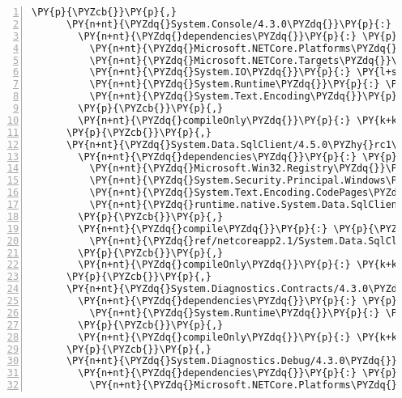 \begin{Verbatim}[commandchars=\\\{\},numbers=left,firstnumber=1,stepnumber=1,numberblanklines=0]
      \PY{p}{\PYZcb{}}\PY{p}{,}
      \PY{n+nt}{\PYZdq{}System.Console/4.3.0\PYZdq{}}\PY{p}{:} \PY{p}{\PYZob{}}
        \PY{n+nt}{\PYZdq{}dependencies\PYZdq{}}\PY{p}{:} \PY{p}{\PYZob{}}
          \PY{n+nt}{\PYZdq{}Microsoft.NETCore.Platforms\PYZdq{}}\PY{p}{:} \PY{l+s+s2}{\PYZdq{}2.1.0\PYZhy{}rc1\PYZdq{}}\PY{p}{,}
          \PY{n+nt}{\PYZdq{}Microsoft.NETCore.Targets\PYZdq{}}\PY{p}{:} \PY{l+s+s2}{\PYZdq{}2.1.0\PYZhy{}rc1\PYZdq{}}\PY{p}{,}
          \PY{n+nt}{\PYZdq{}System.IO\PYZdq{}}\PY{p}{:} \PY{l+s+s2}{\PYZdq{}4.3.0\PYZdq{}}\PY{p}{,}
          \PY{n+nt}{\PYZdq{}System.Runtime\PYZdq{}}\PY{p}{:} \PY{l+s+s2}{\PYZdq{}4.3.0\PYZdq{}}\PY{p}{,}
          \PY{n+nt}{\PYZdq{}System.Text.Encoding\PYZdq{}}\PY{p}{:} \PY{l+s+s2}{\PYZdq{}4.3.0\PYZdq{}}
        \PY{p}{\PYZcb{}}\PY{p}{,}
        \PY{n+nt}{\PYZdq{}compileOnly\PYZdq{}}\PY{p}{:} \PY{k+kc}{true}
      \PY{p}{\PYZcb{}}\PY{p}{,}
      \PY{n+nt}{\PYZdq{}System.Data.SqlClient/4.5.0\PYZhy{}rc1\PYZdq{}}\PY{p}{:} \PY{p}{\PYZob{}}
        \PY{n+nt}{\PYZdq{}dependencies\PYZdq{}}\PY{p}{:} \PY{p}{\PYZob{}}
          \PY{n+nt}{\PYZdq{}Microsoft.Win32.Registry\PYZdq{}}\PY{p}{:} \PY{l+s+s2}{\PYZdq{}4.5.0\PYZhy{}rc1\PYZdq{}}\PY{p}{,}
          \PY{n+nt}{\PYZdq{}System.Security.Principal.Windows\PYZdq{}}\PY{p}{:} \PY{l+s+s2}{\PYZdq{}4.5.0\PYZhy{}rc1\PYZdq{}}\PY{p}{,}
          \PY{n+nt}{\PYZdq{}System.Text.Encoding.CodePages\PYZdq{}}\PY{p}{:} \PY{l+s+s2}{\PYZdq{}4.5.0\PYZhy{}rc1\PYZdq{}}\PY{p}{,}
          \PY{n+nt}{\PYZdq{}runtime.native.System.Data.SqlClient.sni\PYZdq{}}\PY{p}{:} \PY{l+s+s2}{\PYZdq{}4.4.0\PYZdq{}}
        \PY{p}{\PYZcb{}}\PY{p}{,}
        \PY{n+nt}{\PYZdq{}compile\PYZdq{}}\PY{p}{:} \PY{p}{\PYZob{}}
          \PY{n+nt}{\PYZdq{}ref/netcoreapp2.1/System.Data.SqlClient.dll\PYZdq{}}\PY{p}{:} \PY{p}{\PYZob{}}\PY{p}{\PYZcb{}}
        \PY{p}{\PYZcb{}}\PY{p}{,}
        \PY{n+nt}{\PYZdq{}compileOnly\PYZdq{}}\PY{p}{:} \PY{k+kc}{true}
      \PY{p}{\PYZcb{}}\PY{p}{,}
      \PY{n+nt}{\PYZdq{}System.Diagnostics.Contracts/4.3.0\PYZdq{}}\PY{p}{:} \PY{p}{\PYZob{}}
        \PY{n+nt}{\PYZdq{}dependencies\PYZdq{}}\PY{p}{:} \PY{p}{\PYZob{}}
          \PY{n+nt}{\PYZdq{}System.Runtime\PYZdq{}}\PY{p}{:} \PY{l+s+s2}{\PYZdq{}4.3.0\PYZdq{}}
        \PY{p}{\PYZcb{}}\PY{p}{,}
        \PY{n+nt}{\PYZdq{}compileOnly\PYZdq{}}\PY{p}{:} \PY{k+kc}{true}
      \PY{p}{\PYZcb{}}\PY{p}{,}
      \PY{n+nt}{\PYZdq{}System.Diagnostics.Debug/4.3.0\PYZdq{}}\PY{p}{:} \PY{p}{\PYZob{}}
        \PY{n+nt}{\PYZdq{}dependencies\PYZdq{}}\PY{p}{:} \PY{p}{\PYZob{}}
          \PY{n+nt}{\PYZdq{}Microsoft.NETCore.Platforms\PYZdq{}}\PY{p}{:} \PY{l+s+s2}{\PYZdq{}2.1.0\PYZhy{}rc1\PYZdq{}}\PY{p}{,}

\end{Verbatim}
